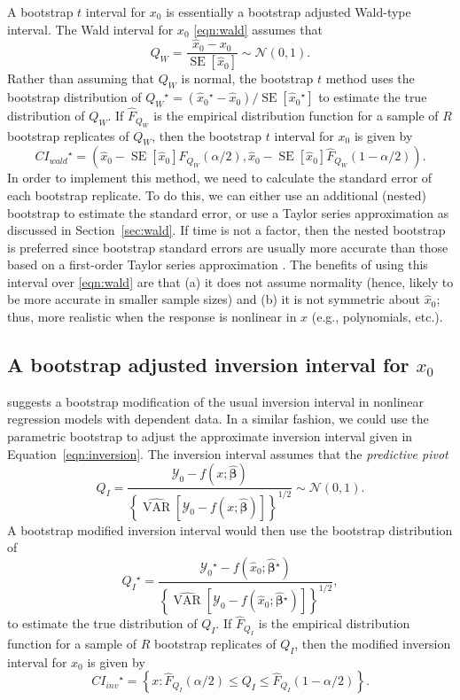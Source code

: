 \documentclass{article}\usepackage[]{graphicx}\usepackage[]{color}
\newcommand{\boot}{\ensuremath{^\star}}
\newcommand{\VAR}{\operatorname{VAR}}
\newcommand{\SE}{\operatorname{SE}}
\begin{document}
A bootstrap $t$ interval for $x_0$ is essentially a bootstrap adjusted Wald-type interval.  The Wald interval for $x_0$ \eqref{eqn:wald} assumes that
\[
  Q_W = \frac{\widehat{x}_0 - x_0}{\SE\left[\widehat{x}_0\right]} \sim \mathcal{N}(0, 1).
\]
Rather than assuming that $Q_W$ is normal, the bootstrap $t$ method uses the bootstrap distribution of $Q_W\boot = \left(\widehat{x}_0\boot - \widehat{x}_0\right)/\SE\left[\widehat{x}_0\boot\right]$ to estimate the true distribution of $Q_W$.  If $\widehat{F}_{Q_W}$ is the empirical distribution function for a sample of $R$ bootstrap replicates of $Q_W$, then the bootstrap $t$  interval for $x_0$ is given by
\[
    CI_{wald}\boot = \left( \widehat{x}_0 -  \SE\left[\widehat{x}_0\right]\widehat{F}_{Q_W}\left(\alpha/2\right),  \widehat{x}_0 -  \SE\left[\widehat{x}_0\right]\widehat{F}_{Q_W}\left(1-\alpha/2\right) \right).
\]
In order to implement this method, we need to calculate the standard error of each bootstrap replicate.  To do this, we can either use an additional (nested) bootstrap to estimate the standard error, or use a Taylor series approximation as discussed in Section~\ref{sec:wald}.  If time is  not a factor, then the nested bootstrap is preferred since bootstrap standard errors are usually more accurate than those based on a first-order Taylor series approximation \citep[pp. 478-480]{casella-statistical-2002}.  The benefits of using this interval over \eqref{eqn:wald} are that (a) it does not assume normality (hence, likely to be more accurate in smaller sample sizes) and (b) it is not symmetric about $\widehat{x}_0$; thus, more realistic when the response is nonlinear in $x$ (e.g., polynomials, etc.).


\subsection{A bootstrap adjusted inversion interval for $x_0$}

\citet{huet-statistical-2004} suggests a bootstrap modification of the usual inversion interval in nonlinear regression models with dependent data.  In a similar fashion, we could use the parametric bootstrap to adjust the approximate inversion interval given in Equation~\eqref{eqn:inversion}.  The inversion interval assumes that the \emph{predictive pivot}
\[
  Q_I = \frac{\mathcal{Y}_0-f\left(x; \widehat{\bm{\beta}}\right)}{\left\{ \widehat{\VAR}\left[\mathcal{Y}_0 - f\left(x; \widehat{\bm{\beta}}\right)\right] \right\}^{1/2}} \sim \mathcal{N}(0, 1).
\]
A bootstrap modified inversion interval would then use the bootstrap distribution of
\[
  Q_I\boot = \frac{\mathcal{Y}_0\boot-f\left(\widehat{x}_0; \widehat{\bm{\beta}}\boot\right)}{\left\{ \widehat{\VAR}\left[\mathcal{Y}_0 - f\left(\widehat{x}_0; \widehat{\bm{\beta}}\boot\right)\right] \right\}^{1/2}},
\]
to estimate the true distribution of $Q_I$.  If $\widehat{F}_{Q_I}$ is the empirical distribution function for a sample of $R$ bootstrap replicates of $Q_I$, then the modified inversion interval for $x_0$ is given by
\[
    CI_{inv}\boot = \left\{ x: \widehat{F}_{Q_I}\left(\alpha/2\right) \le Q_I \le \widehat{F}_{Q_I}\left(1-\alpha/2\right) \right\}.
\]
\vspace{25pt}




\end{document}
